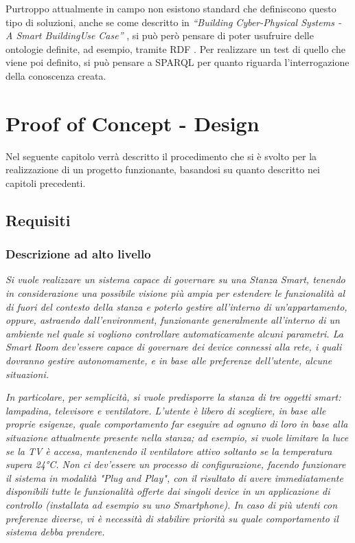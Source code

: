 \documentclass[12pt,a4paper,openright,oneside]{report}
\newcommand{\quotes}[1]{``#1''}
\begin{document}
Purtroppo attualmente in campo non esistono standard che definiscono questo tipo di soluzioni, anche se come descritto in \textit{\quotes{Building Cyber-Physical Systems - A Smart BuildingUse Case}} \cite{smartbuilding}, si può però pensare di poter usufruire delle ontologie definite, ad esempio, tramite RDF \cite{rdf}. Per realizzare un test di quello che viene poi definito, si può pensare a SPARQL \cite{sparql} per quanto riguarda l'interrogazione della conoscenza creata.



\clearpage{\pagestyle{empty}\cleardoublepage}
\chapter{Proof of Concept - Design}           %
\lhead[\fancyplain{}{\bfseries\thepage}]{\fancyplain{}{\bfseries\rightmark}}  

Nel seguente capitolo verrà descritto il procedimento che si è svolto per la realizzazione di un progetto funzionante, basandosi su quanto descritto nei capitoli precedenti.

\section{Requisiti}

\subsection{Descrizione ad alto livello}
\textsl{Si vuole realizzare un sistema capace di governare su una Stanza Smart, tenendo in considerazione una possibile visione più ampia per estendere le funzionalità al di fuori del contesto della stanza e poterlo gestire all'interno di un'appartamento, oppure, astraendo dall'environment, funzionante generalmente all'interno di un ambiente nel quale si vogliono controllare automaticamente alcuni parametri. La Smart Room dev'essere capace di governare dei device connessi alla rete, i quali dovranno gestire autonomamente, e in base alle preferenze dell'utente, alcune situazioni.\\}

\textsl{In particolare, per semplicità, si vuole predisporre la stanza di tre oggetti smart: lampadina, televisore e ventilatore. L'utente è libero di scegliere, in base alle proprie esigenze, quale comportamento far eseguire ad ognuno di loro in base alla situazione attualmente presente nella stanza; ad esempio, si vuole limitare la luce se la TV è accesa, mantenendo il ventilatore attivo soltanto se la temperatura supera 24°C. Non ci dev'essere un processo di configurazione, facendo funzionare il sistema in modalità "Plug and Play", con il risultato di avere immediatamente disponibili tutte le funzionalità offerte dai singoli device in un applicazione di controllo (installata ad esempio su uno Smartphone). In caso di più utenti con preferenze diverse, vi è necessità di stabilire priorità su quale comportamento il sistema debba prendere.}
\end{document}
